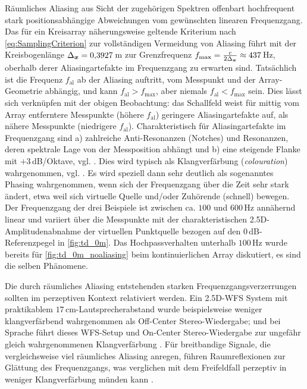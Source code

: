 


Räumliches Aliasing aus Sicht der zugehörigen Spektren offenbart
hochfrequent stark positionsabhängige Abweichungen vom gewünschten linearen
Frequenzgang.
%
Das für ein Kreisarray näherungsweise geltende Kriterium nach \Glg\eqref{eq:SamplingCriterion} zur vollständigen
Vermeidung von Aliasing
führt mit der Kreisbogenlänge
$\Delta_{\bm{x}}=0{,}3927$\,m zur Grenzfrequenz
$f_\text{max} = \frac{c}{2 \Delta_{\bm{x}}}\approx 437$\,Hz,
oberhalb derer Aliasingartefakte im Frequenzgang zu erwarten sind.
%
Tatsächlich ist die Frequenz $f_\text{al}$ ab der Aliasing auftritt,
vom Messpunkt und der Array-Geometrie abhängig, und
kann $f_\text{al}>f_\text{max}$, aber niemals $f_\text{al}<f_\text{max}$ sein.
%
Dies lässt sich verknüpfen mit der obigen Beobachtung: das Schallfeld
weist für mittig vom Array entferntere Messpunkte (höhere $f_\text{al}$) geringere
Aliasingartefakte auf, als nähere Messpunkte (niedrigere $f_\text{al}$).
%
Charakteristisch für Aliasingartefakte
im Frequenzgang sind a) zahlreiche Anti-Resonanzen (Notches) und Resonanzen,
deren spektrale Lage von der Messposition abhängt und
b) eine steigende Flanke mit $+3$\,dB/Oktave,
vgl. \cite{Spors2010a}.
%
Dies wird typisch als Klangverfärbung (\textit{colouration})
wahrgenommen, vgl. \cite{Start1997_diss, Wittek2007_JAES, Wierstorf2014_diss, Winter2019_diss, Erbes2020_diss}.
%
Es wird speziell dann sehr deutlich als sogenanntes Phasing wahrgenommen,
wenn sich der Frequenzgang über die Zeit sehr stark ändert, etwa weil sich
virtuelle Quelle und/oder Zuhörende (schnell) bewegen.
%
Der Frequenzgang der drei Beispiele ist zwischen ca. $100$ und $600$\,Hz
annähernd linear und variiert über die Messpunkte mit der charakteristischen
2.5D-Amplitudenabnahme der virtuellen Punktquelle bezogen auf den
$0$\,dB-Referenzpegel in \Abb\ref{fig:td_0m}.
%
Das Hochpassverhalten unterhalb $100$\,Hz wurde bereits für
\Abb\ref{fig:td_0m_noaliasing} beim kontinuierlichen Array diskutiert,
es sind die selben Phänomene.


Die durch räumliches Aliasing entstehenden starken Frequenzgangsverzerrungen
sollten im perzeptiven Kontext relativiert werden.
%
Ein 2.5D-WFS System mit praktikablem $17$\,cm-Lautsprecherabstand
wurde beispielsweise weniger klangverfärbend wahrgenommen als
Off-Center Stereo-Wiedergabe; und bei Sprache führt dieses WFS-Setup und On-Center
Stereo-Wiedergabe zur ungefähr gleich wahrgenommenen
Klangverfärbung \cite{Wierstorf2014_diss}.
%
Für breitbandige Signale, die vergleichsweise viel räumliches Aliasing anregen,
führen Raumreflexionen zur Glättung des Frequenzgangs, was verglichen mit dem
Freifeldfall perzeptiv in weniger Klangverfärbung münden kann \cite{Erbes2020_diss}.



